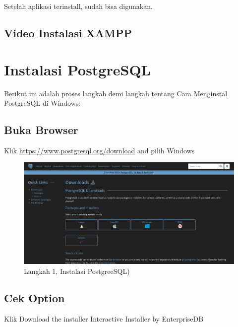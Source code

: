 \documentclass[
]{book}
\begin{document}
Setelah aplikasi terinstall, sudah bisa digunakan.

\hypertarget{video-instalasi-xampp}{%
\subsection{Video Instalasi XAMPP}\label{video-instalasi-xampp}}

\hypertarget{instalasi-postgresql}{%
\section{Instalasi PostgreSQL}\label{instalasi-postgresql}}

Berikut ini adalah proses langkah demi langkah tentang Cara Menginstal PostgreSQL di Windows:

\hypertarget{buka-browser}{%
\subsection{Buka Browser}\label{buka-browser}}

Klik \url{https://www.postgresql.org/download} and pilih Windows

\begin{figure}

{\centering \includegraphics[width=1\linewidth]{./images/Bab1/Postgree0} 

}

\caption{Langkah 1, Instalasi PostgreeSQL)}\label{fig:install-posrgree1}
\end{figure}

\hypertarget{cek-option}{%
\subsection{Cek Option}\label{cek-option}}

Klik Download the installer Interactive Installer by EnterpriseDB
\end{document}
